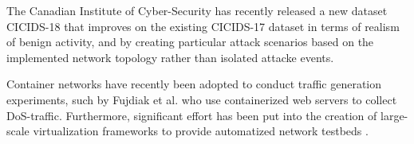 \documentclass[a4paper,12pt,twoside]{article}
\begin{document}
The Canadian Institute of Cyber-Security has recently released a new dataset CICIDS-18 that improves on the existing CICIDS-17 dataset \cite{sharafaldin2018towards} in terms of realism of benign activity, and by creating particular attack scenarios based on the implemented network topology rather than isolated attacke events. 

Container networks have recently been adopted to conduct traffic generation experiments, such by Fujdiak et al. \cite{fujdiak2018ip} who use containerized web servers to collect DoS-traffic. Furthermore, significant effort has been put into the creation of large-scale virtualization frameworks to provide automatized network testbeds \cite{crussell2015minimega, badiger2018violet}.

\end{document}
